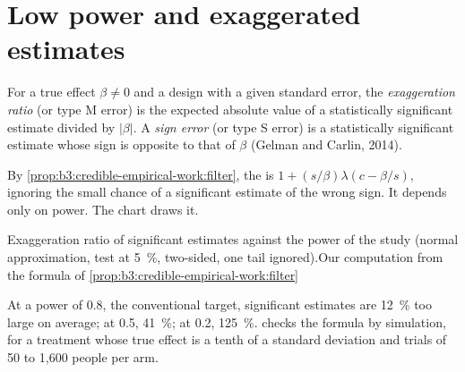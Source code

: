 \section{Low power and exaggerated estimates}\label{sec:b3:credible-empirical-work:power}

\begin{definition}\label{def:b3:credible-empirical-work:exaggeration}
For a true effect $\beta \ne 0$ and a design with a given standard error, the
\emph{exaggeration ratio} (or type M error) is the expected absolute value of a
statistically significant estimate divided by $|\beta|$. A \emph{sign error} (or
type S error) is a statistically significant estimate whose sign is opposite to
that of $\beta$ (Gelman and Carlin, 2014).
\end{definition}

By \cref{prop:b3:credible-empirical-work:filter}, the  is
$1 + (s/\beta)\lambda(c - \beta/s)$, ignoring the small chance of a significant
estimate of the wrong sign. It depends only on power. The chart draws it.

\begin{omchart}{Exaggeration ratio of significant estimates against the power
of the study (normal approximation, test at 5~\%, two-sided, one tail ignored).}{Our
computation from the formula of
\cref{prop:b3:credible-empirical-work:filter}}
\end{omchart}

At a power of 0.8, the conventional target, significant estimates are 12~\% too
large on average; at 0.5, 41~\%; at 0.2, 125~\%. %
 checks the formula by simulation, for
a treatment whose true effect is a tenth of a standard deviation and trials of
50 to 1{,}600 people per arm.

